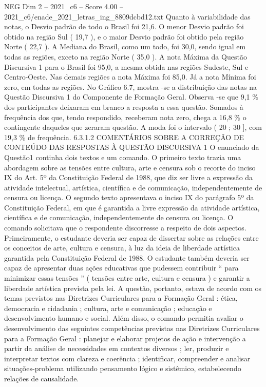 \begin{textsample}{NEG Dim 2 – 2021\_c6 – Score 4.00 – 2021\_c6/enade\_2021\_letras\_ing\_8809dcbd12.txt}
Quanto à variabilidade das notas, o Desvio padrão de todo o Brasil foi 21,6.
O menor Desvio padrão foi obtido na região Sul ( 19,7 ), e o maior Desvio padrão foi obtido pela região Norte ( 22,7 ).
A Mediana do Brasil, como um todo, foi 30,0, sendo igual em todas as regiões, exceto na região Norte ( 35,0 ).
A nota Máxima da Questão Discursiva 1 para o Brasil foi 95,0, a mesma obtida nas regiões Sudeste, Sul e Centro-Oeste.
Nas demais regiões a nota Máxima foi 85,0.
Já a nota Mínima foi zero, em todas as regiões.
No Gráfico 6.7, mostra -se a distribuição das notas na Questão Discursiva 1 do Componente de Formação Geral.
Observa -se que 9,1 \% dos participantes deixaram em branco a resposta a essa questão.
Somados à frequência dos que, tendo respondido, receberam nota zero, chega a 16,8 \% o contingente daqueles que zeraram questão.
A moda foi o intervalo ( 20 ; 30 ], com 19,3 \% de frequência. 6.3.1.2 COMENTÁRIOS SOBRE A CORREÇÃO DE CONTEÚDO DAS RESPOSTAS À QUESTÃO DISCURSIVA 1 O enunciado da Questão1 continha dois textos e um comando.
O primeiro texto trazia uma abordagem sobre as tensões entre cultura, arte e censura sob o recorte do inciso IX do Art. 5º da Constituição Federal de 1988, que diz ser livre a expressão da atividade intelectual, artística, científica e de comunicação, independentemente de censura ou licença.
O segundo texto apresentava o inciso IX do parágrafo 5º da Constituição Federal, em que é garantida a livre expressão da atividade artística, científica e de comunicação, independentemente de censura ou licença.
O comando solicitava que o respondente discorresse a respeito de dois aspectos.
Primeiramente, o estudante deveria ser capaz de dissertar sobre as relações entre os conceitos de arte, cultura e censura, à luz da ideia de liberdade artística garantida pela Constituição Federal de 1988.
O estudante também deveria ser capaz de apresentar duas ações educativas que pudessem contribuir “ para minimizar essas tensões ” ( tensões entre arte, cultura e censura ) e garantir a liberdade artística prevista pela lei.
A questão, portanto, estava de acordo com os temas previstos nas Diretrizes Curriculares para a Formação Geral : ética, democracia e cidadania ; cultura, arte e comunicação ; educação e desenvolvimento humano e social.
Além disso, o comando permitia avaliar o desenvolvimento das seguintes competências previstas nas Diretrizes Curriculares para a Formação Geral : planejar e elaborar projetos de ação e intervenção a partir da análise de necessidades em contextos diversos ; ler, produzir e interpretar textos com clareza e coerência ; identificar, compreender e analisar situações-problema utilizando pensamento lógico e sistêmico, estabelecendo relações de causalidade.

\end{textsample}
